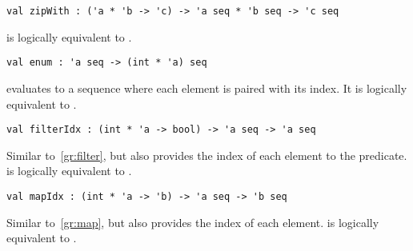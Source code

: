 \begin{cluster}
\label{grp:gr:zipWith}

\begin{gram}[zipWith]
\label{gr:zipWith}
\begin{verbatim}
val zipWith : ('a * 'b -> 'c) -> 'a seq * 'b seq -> 'c seq
\end{verbatim}
 is logically equivalent to .

\end{gram}
\end{cluster}

\begin{cluster}
\label{grp:gr:enum}

\begin{gram}[enum]
\label{gr:enum}
\begin{verbatim}
val enum : 'a seq -> (int * 'a) seq
\end{verbatim}
 evaluates to a sequence where each element is paired with its
index. It is logically equivalent to
.

\end{gram}
\end{cluster}

\begin{cluster}
\label{grp:gr:filterIdx}

\begin{gram}[filterIdx]
\label{gr:filterIdx}
\begin{verbatim}
val filterIdx : (int * 'a -> bool) -> 'a seq -> 'a seq
\end{verbatim}
Similar to~\ref{gr:filter}, but also provides the
index of each element to the predicate.
 is logically equivalent to
.

\end{gram}
\end{cluster}

\begin{cluster}
\label{grp:gr:mapIdx}

\begin{gram}[mapIdx]
\label{gr:mapIdx}
\begin{verbatim}
val mapIdx : (int * 'a -> 'b) -> 'a seq -> 'b seq
\end{verbatim}
Similar to~\ref{gr:map}, but also provides the index of each element.
 is logically equivalent to .

\end{gram}
\end{cluster}

